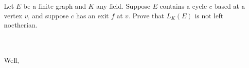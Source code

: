 Let $E$ be a finite graph and $K$ any field. Suppose $E$ contains a cycle $c$ based at a vertex $v$, and suppose $c$ 
has an exit $f$ at $v$. Prove that $L_K(E)$ is not left noetherian.\\\\

\begin{solution}\renewcommand{\qedsymbol}{}\ \\
    Well,
\end{solution}